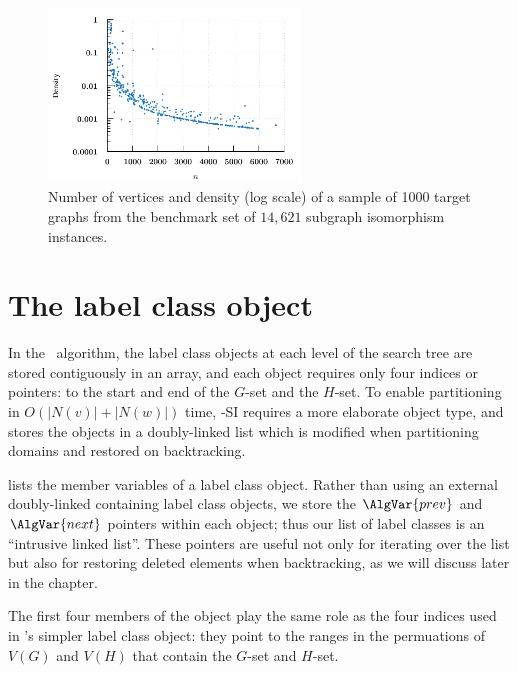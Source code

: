 \begin{figure}[h!]
    \centering
    \includegraphics*[width=0.6\textwidth]{14b-mcsplit-induced-si/density-chart/plots/n-density}
    \caption{Number of vertices and density (log scale) of a sample of 1000 target graphs from the benchmark set
    of $14,621$ subgraph isomorphism instances.}
    \label{figure:si-targets-n-density}
\end{figure}

\section{The label class object}

In the \McSplit\ algorithm, the label class objects at each level of the search tree are stored
contiguously in an array, and each object requires only four indices or pointers: to the start and
end of the $G$-set and the $H$-set.  To enable partitioning in $O(|N(v)| + |N(w)|)$ time, \McSplit-SI
requires a more elaborate object type, and stores the objects in a doubly-linked list which is modified
when partitioning domains and restored on backtracking.

 lists the member variables of a label class object.  Rather than
using an external doubly-linked containing label class objects, we store the $\AlgVar{prev}$
and $\AlgVar{next}$ pointers within each object; thus our list of label classes is an ``intrusive
linked list''.  These pointers are useful not only for iterating over the list but also
for restoring deleted elements when backtracking, as we will discuss later in the chapter.

The first four members of the object play the same role as the four indices used in \McSplit's
simpler label class object: they point to the ranges in the permuations of $V(G)$ and $V(H)$ that
contain the $G$-set and $H$-set.

\FloatBarrier

